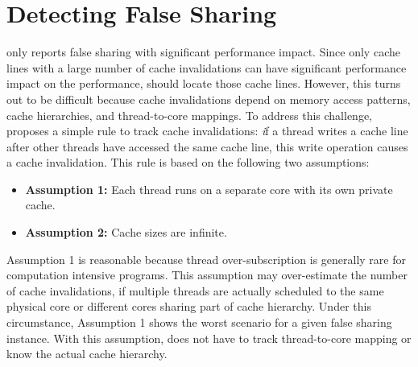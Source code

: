 \section{Detecting False Sharing}
\label{sec:detect}

\cheetah{} only reports false sharing with significant performance impact. 
Since only cache lines with a large number of cache invalidations can have significant performance impact on the performance, \cheetah{} should locate those cache lines. However, this turns out to be difficult because cache invalidations depend on memory access patterns, cache hierarchies, and thread-to-core mappings. 
To address this challenge, \cheetah{} proposes a simple rule to track cache invalidations: {\emph if a thread writes a cache line after other threads have accessed the same cache line, this write operation causes a cache invalidation}. This rule is based on the following two assumptions:
 

\begin{itemize} 
\item {\bf Assumption 1:} Each thread runs on a separate core with its own private cache. 

\item {\bf Assumption 2: } Cache sizes are infinite. 
 
\end{itemize}

Assumption 1 is reasonable because thread over-subscription is generally rare for computation intensive programs. This assumption may over-estimate the number of cache invalidations, if multiple threads are actually scheduled to the same physical core or different cores sharing part of cache hierarchy. Under this circumstance, Assumption 1 shows the worst scenario for a given false sharing instance. With this assumption, \cheetah{} does not have to track thread-to-core mapping or know the actual cache hierarchy. 

